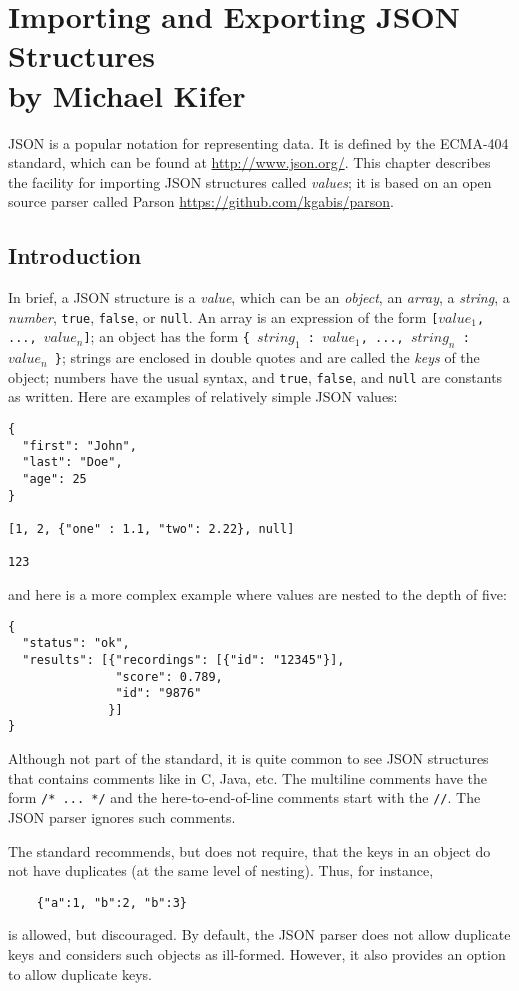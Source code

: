 \chapter[Importing JSON Structures]
{Importing and Exporting JSON Structures\\
  {\Large by Michael Kifer}}

JSON is a popular notation for representing data. It is defined
by the ECMA-404 standard, which can be found at \url{http://www.json.org/}.
This chapter describes the \ERGO facility for importing JSON structures
called \emph{values}; it is based on an open source parser called Parson
\url{https://github.com/kgabis/parson}.

\section{Introduction}

In brief, a JSON structure is a \emph{value}, which can be
  an \emph{object}, an
\emph{array}, a \emph{string}, a \emph{number},  \texttt{true}, \texttt{false},
or \texttt{null}. An array is an expression of the form
\texttt{[$value_1$, ..., $value_n$]}; an object has the form
\texttt{\{ $string_1$ : $value_1$,  ..., $string_n$ : $value_n$
  \}}; strings are enclosed in double quotes and are called the \emph{keys}
of the object; numbers have the usual
syntax, and \texttt{true}, \texttt{false}, and \texttt{null} are constants
as written. Here are examples of relatively simple JSON values:
\begin{verbatim}
{
  "first": "John",
  "last": "Doe",
  "age": 25
}

[1, 2, {"one" : 1.1, "two": 2.22}, null]

123
\end{verbatim}
and here is a more complex example where values are nested to the depth of
five:
\begin{verbatim}
{
  "status": "ok",
  "results": [{"recordings": [{"id": "12345"}],
               "score": 0.789,
               "id": "9876"
              }]
}
\end{verbatim}

Although not part of the standard, it is quite common to see JSON
structures that contains comments like in C, Java, etc. The multiline
comments have the form \texttt{/* ... */} and the here-to-end-of-line
comments start with the \texttt{//}. The JSON parser ignores such comments.

The standard recommends, but does not require, that the keys in an object
do not have duplicates (at the same level of nesting). Thus, for instance,
\begin{verbatim}
    {"a":1, "b":2, "b":3}
\end{verbatim}
is allowed, but discouraged. By default, the JSON parser does not allow
duplicate keys and considers such objects as ill-formed. However, it also
provides an option to allow duplicate keys.


